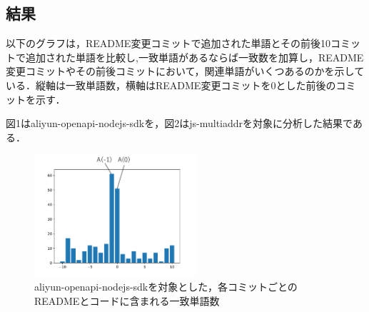 \documentclass[uplatex,dvipdfmx,a4paper,twocolumn,base=11pt,jbase=11pt,ja=standard]{bxjsarticle}  %
\begin{document}
\subsection{結果}


以下のグラフは，README変更コミットで追加された単語とその前後10コミットで追加された単語を比較し,一致単語があるならば一致数を加算し，README変更コミットやその前後コミットにおいて，関連単語がいくつあるのかを示している．縦軸は一致単語数，横軸はREADME変更コミットを0とした前後のコミットを示す．


図1はaliyun-openapi-nodejs-sdkを，図2はjs-multiaddrを対象に分析した結果である．


\begin{figure}[h]
\begin{center}
\includegraphics[width=6cm]{IPSJ202303_Shirasaki/draft/use_aliyun.pdf}
\caption{aliyun-openapi-nodejs-sdkを対象とした，各コミットごとのREADMEとコードに含まれる一致単語数}
\end{center}
\end{figure}
\end{document}
